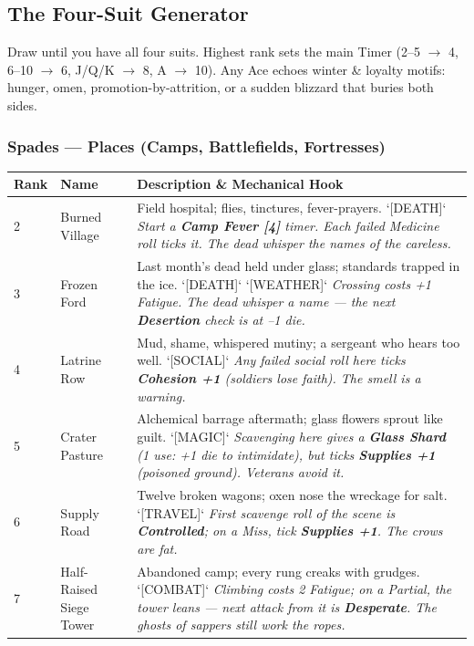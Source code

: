\subsection*{The Four-Suit Generator}

Draw until you have all four suits. Highest rank sets the main Timer (2--5 $\rightarrow$ 4, 6--10 $\rightarrow$ 6, J/Q/K $\rightarrow$ 8, A $\rightarrow$ 10). Any Ace echoes winter \& loyalty motifs: hunger, omen, promotion-by-attrition, or a sudden blizzard that buries both sides.

\subsubsection*{Spades --- Places (Camps, Battlefields, Fortresses)}

\begin{longtable}{|p{}|p{}|p{}|}
\hline
\textbf{Rank} & \textbf{Name} & \textbf{Description \& Mechanical Hook} \\
\hline
2 & Burned Village & Field hospital; flies, tinctures, fever-prayers. `[DEATH]` \textit{Start a \textbf{Camp Fever [4]} timer. Each failed Medicine roll ticks it. The dead whisper the names of the careless.} \\
\hline
3 & Frozen Ford & Last month's dead held under glass; standards trapped in the ice. `[DEATH]` `[WEATHER]` \textit{Crossing costs +1 Fatigue. The dead whisper a name --- the next \textbf{Desertion} check is at --1 die.} \\
\hline
4 & Latrine Row & Mud, shame, whispered mutiny; a sergeant who hears too well. `[SOCIAL]` \textit{Any failed social roll here ticks \textbf{Cohesion +1} (soldiers lose faith). The smell is a warning.} \\
\hline
5 & Crater Pasture & Alchemical barrage aftermath; glass flowers sprout like guilt. `[MAGIC]` \textit{Scavenging here gives a \textbf{Glass Shard} (1 use: +1 die to intimidate), but ticks \textbf{Supplies +1} (poisoned ground). Veterans avoid it.} \\
\hline
6 & Supply Road & Twelve broken wagons; oxen nose the wreckage for salt. `[TRAVEL]` \textit{First scavenge roll of the scene is \textbf{Controlled}; on a Miss, tick \textbf{Supplies +1}. The crows are fat.} \\
\hline
7 & Half-Raised Siege Tower & Abandoned camp; every rung creaks with grudges. `[COMBAT]` \textit{Climbing costs 2 Fatigue; on a Partial, the tower leans --- next attack from it is \textbf{Desperate}. The ghosts of sappers still work the ropes.} \\

\end{longtable}
